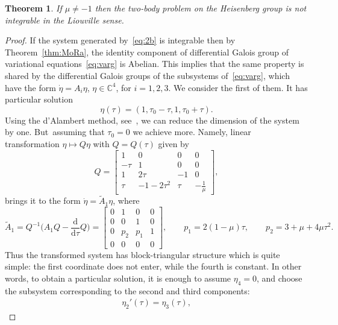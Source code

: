 \documentclass[11pt]{article}
\numberwithin{equation}{section}
\numberwithin{equation}{section}
\newtheorem{Theorem}{Theorem}[section]
\begin{document}
\begin{Theorem} %
 If $\mu\neq -1$ then the two-body problem on the Heisenberg group is
 not integrable in the Liouville sense.
\end{Theorem}
\begin{proof}
 If the system generated by~\eqref{eq:2b} is integrable then by
 Theorem~\ref{thm:MoRa}, the identity component of differential
 Galois group of variational equations~\eqref{eq:varg} is Abelian.
 This implies that the same property is shared by the differential Galois groups
 of the subsystems of~\eqref{eq:varg}, which have the form
 $\dot\eta=A_i \eta$, $\eta\in\mathbb{C}^4$, for $i=1,2,3$. We
 consider the first of them. It has particular solution
 \begin{equation}
 \label{par}
 \eta(\tau)=(1, \tau_0-\tau,1, \tau_0+\tau).
 \end{equation}
 Using the d'Alambert method, see~\cite{Walter}, we can reduce the
 dimension of the system by one. But~assuming that $\tau_0=0$ we
 achieve more. Namely, linear transformation $\eta\mapsto Q\eta$ with
 $Q=Q(\tau)$ given by
 \begin{equation*}
 Q = \begin{bmatrix}
 1 & 0 & 0 & 0\\
 -\tau & 1 & 0 & 0\\
 1 & 2\tau & -1 & 0\\
 \tau & -1-2\tau^2 & \tau & -\frac{1}{\mu}
 \end{bmatrix}\!,
 \end{equation*}
 brings it to the form $\dot{\eta}=\widetilde{A}_1\eta$, where
 \begin{equation*}
 \widetilde{A}_1 =Q^{-1}\bigg(A_1 Q -\frac{\mathrm{d}}{\mathrm{d}\tau}Q\bigg) = \begin{bmatrix}
 0 & 1 & 0 & 0\\
 0 & 0 & 1 & 0\\
 0 & p_2 & p_1 & 1\\
 0 & 0 & 0 & 0
 \end{bmatrix}\!,\qquad p_1 = 2(1-\mu)\tau,\qquad p_2 =
 3+\mu+4\mu\tau^2.
 \end{equation*}
 Thus the transformed system has block-triangular structure which is
 quite simple: the first coordinate does not enter, while the fourth
 is constant. In other words, to obtain a particular solution, it is
 enough to assume $\eta_4=0$, and choose the subsystem corresponding to the second and third
 components:
 \begin{gather*}
 \eta_2'(\tau) = \eta_3(\tau),

\end{gather*}
\end{proof}
\end{document}
